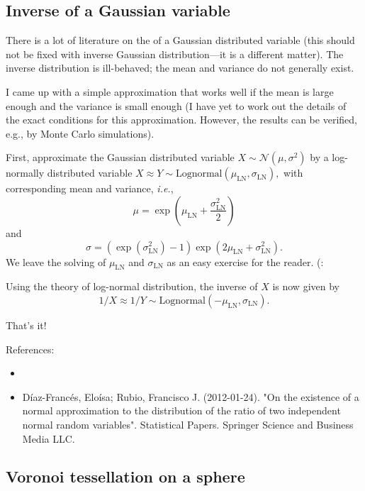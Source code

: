 \documentclass{article}
\begin{document}
\subsection{Inverse of a Gaussian variable}

There is a lot of literature on the  of a Gaussian distributed variable (this should not be fixed with inverse Gaussian distribution---it is a different matter). The inverse distribution is ill-behaved; the mean and variance do not generally exist.

I came up with a simple approximation that works well if the mean is large enough and the variance is small enough (I have yet to work out the details of the exact conditions for this approximation. However, the results can be verified, e.g., by Monte Carlo simulations).

First, approximate the Gaussian distributed variable $X \sim \mathcal{N}(\mu, \sigma^2)$ by a log-normally distributed variable $X \approx Y \sim \text{Lognormal}(\mu_{\text{LN}}, \sigma_{\text{LN}}),$ with corresponding mean and variance, \textit{i.e.}, $$\mu = \exp\left( \mu_{\text{LN}} + \frac{\sigma_{\text{LN}}^2}{2} \right)$$ and
$$\sigma = (\exp( \sigma_{\text{LN}}^2) - 1)\exp(2 \mu_{\text{LN}} + \sigma_{\text{LN}}^2).$$ We leave the solving of $\mu_{\text{LN}}$ and $\sigma_{\text{LN}}$ as an easy exercise for the reader. (:


Using the theory of log-normal distribution, the inverse of $X$ is now given by
$$
1/X \approx 1/Y \sim \text{Lognormal}(-\mu_{\text{LN}}, \sigma_{\text{LN}}).
$$

That's it!



References:
\begin{itemize}
\item {}
\item  Díaz-Francés, Eloísa; Rubio, Francisco J. (2012-01-24). "On the existence of a normal approximation to the distribution of the ratio of two independent normal random variables". Statistical Papers. Springer Science and Business Media LLC.
\end{itemize}

\subsection{Voronoi tessellation on a sphere}
\end{document}
